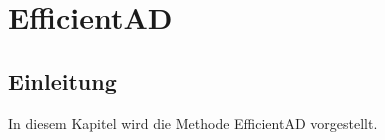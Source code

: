 
\chapter{EfficientAD} \label{ch:EfficientAD}
\section{Einleitung} \label{sec:Einleitung}
In diesem Kapitel wird die Methode EfficientAD vorgestellt. \
